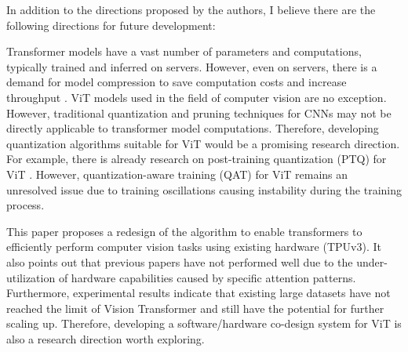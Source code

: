 \documentclass[12pt]{article}
\begin{document}
In addition to the directions proposed by the authors, I believe there are the following directions for future development:

Transformer models have a vast number of parameters and computations, typically trained and inferred on servers. However, even on servers, there is a demand for model compression to save computation costs and increase throughput \cite{zhao_atom_2023}. ViT models used in the field of computer vision are no exception. However, traditional quantization and pruning techniques for CNNs may not be directly applicable to transformer model computations. Therefore, developing quantization algorithms suitable for ViT would be a promising research direction. For example, there is already research on post-training quantization (PTQ) for ViT \cite{liu_post-training_2021}. However, quantization-aware training (QAT) for ViT remains an unresolved issue due to training oscillations causing instability during the training process.

This paper proposes a redesign of the algorithm to enable transformers to efficiently perform computer vision tasks using existing hardware (TPUv3). It also points out that previous papers have not performed well due to the under-utilization of hardware capabilities caused by specific attention patterns. Furthermore, experimental results indicate that existing large datasets have not reached the limit of Vision Transformer and still have the potential for further scaling up. Therefore, developing a software/hardware co-design system for ViT is also a research direction worth exploring.


\printbibliography
\end{document}
